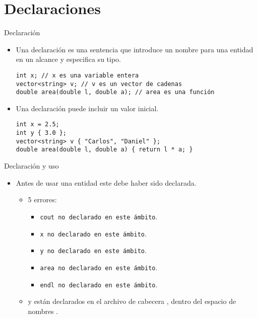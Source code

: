 \section{Declaraciones}

\begin{frame}[fragile]{Declaración}
\begin{itemize}
  \item Una \alert{declaración} es una sentencia que introduce un nombre
        para una entidad en un alcance y especifica su tipo.
\begin{lstlisting}
int x; // x es una variable entera
vector<string> v; // v es un vector de cadenas
double area(double l, double a); // area es una función
\end{lstlisting}
  \item Una declaración puede incluir un valor inicial.
\begin{lstlisting}
int x = 2.5;
int y { 3.0 };
vector<string> v { "Carlos", "Daniel" };
double area(double l, double a) { return l * a; }
\end{lstlisting}
\end{itemize}
\end{frame}

\begin{frame}[fragile]{Declaración y uso}
\begin{itemize}
  \item Antes de usar una entidad este debe haber sido declarada.

    \begin{itemize}
      \item 5 errores:
        \begin{itemize}
          \item \verb+cout no declarado en este ámbito+.
          \item \verb+x no declarado en este ámbito+.
          \item \verb+y no declarado en este ámbito+.
          \item \verb+area no declarado en este ámbito+.
          \item \verb+endl no declarado en este ámbito+.
        \end{itemize}
      \item {} y  están \alert{declarados} en el archivo de 
            cabecera , dentro del espacio de nombres .
    \end{itemize}
\end{itemize}
\end{frame}

